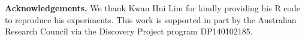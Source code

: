 \documentclass{sig-alternate-05-2015}
\begin{document}








\vspace{1em}
\noindent
\textbf{Acknowledgements.}
We thank Kwan Hui Lim for kindly providing his R code to reproduce his experiments.
This work is supported in part by the Australian Research Council via the Discovery Project program DP140102185.


{\small


}

%
\end{document}

